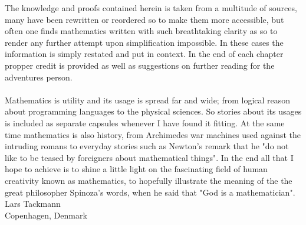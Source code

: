 The knowledge and proofs contained herein is taken from a multitude of sources, many have been rewritten or reordered so to make
them more accessible, but often one finds mathematics written with such breathtaking clarity as so to render any further attempt
upon simplification impossible. In these cases the information is simply restated and put in context. In the end of each chapter
propper credit is provided as well as suggestions on further reading for the adventures person.\\ 
\\
\indent Mathematics is utility and its usage is spread far and wide; from logical reason about programming languages to the physical sciences. So stories about its usages is included as separate capsules whenever I have found it fitting. At the same time mathematics is also history, from Archimedes war machines used against the intruding romans to everyday stories such as Newton's remark that he "do not like to be teased by foreigners about mathematical things". In the end all that I hope to achieve is to shine a little light on the fascinating field of human creativity known as mathematics, to hopefully illustrate the meaning of the the great philosopher Spinoza's words, when he said that "God is a mathematician". \\
\flushright Lars Tackmann \\ Copenhagen, Denmark\flushleft
